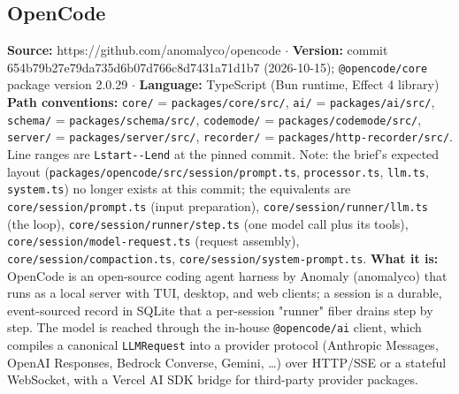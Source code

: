 \subsection{OpenCode}

\textbf{Source:} https://github.com/anomalyco/opencode $\cdot$ \textbf{Version:} commit 654b79b27e79da735d6b07d766c8d7431a71d1b7 (2026-10-15); \texttt{@opencode/\allowbreak{}core} package version 2.0.29 $\cdot$ \textbf{Language:} TypeScript (Bun runtime, Effect 4 library)
\textbf{Path conventions:} \texttt{core/\allowbreak{}} = \texttt{packages/\allowbreak{}core/\allowbreak{}src/\allowbreak{}}, \texttt{ai/\allowbreak{}} = \texttt{packages/\allowbreak{}ai/\allowbreak{}src/\allowbreak{}}, \texttt{schema/\allowbreak{}} = \texttt{packages/\allowbreak{}schema/\allowbreak{}src/\allowbreak{}}, \texttt{codemode/\allowbreak{}} = \texttt{packages/\allowbreak{}codemode/\allowbreak{}src/\allowbreak{}}, \texttt{server/\allowbreak{}} = \texttt{packages/\allowbreak{}server/\allowbreak{}src/\allowbreak{}}, \texttt{recorder/\allowbreak{}} = \texttt{packages/\allowbreak{}http-\allowbreak{}recorder/\allowbreak{}src/\allowbreak{}}. Line ranges are \texttt{Lstart-\allowbreak{}-\allowbreak{}Lend} at the pinned commit. Note: the brief's expected layout (\texttt{packages/\allowbreak{}opencode/\allowbreak{}src/\allowbreak{}session/\allowbreak{}prompt.\allowbreak{}ts}, \texttt{processor.\allowbreak{}ts}, \texttt{llm.\allowbreak{}ts}, \texttt{system.\allowbreak{}ts}) no longer exists at this commit; the equivalents are \texttt{core/\allowbreak{}session/\allowbreak{}prompt.\allowbreak{}ts} (input preparation), \texttt{core/\allowbreak{}session/\allowbreak{}runner/\allowbreak{}llm.\allowbreak{}ts} (the loop), \texttt{core/\allowbreak{}session/\allowbreak{}runner/\allowbreak{}step.\allowbreak{}ts} (one model call plus its tools), \texttt{core/\allowbreak{}session/\allowbreak{}model-\allowbreak{}request.\allowbreak{}ts} (request assembly), \texttt{core/\allowbreak{}session/\allowbreak{}compaction.\allowbreak{}ts}, \texttt{core/\allowbreak{}session/\allowbreak{}system-\allowbreak{}prompt.\allowbreak{}ts}.
\textbf{What it is:} OpenCode is an open-source coding agent harness by Anomaly (anomalyco) that runs as a local server with TUI, desktop, and web clients; a session is a durable, event-sourced record in SQLite that a per-session "runner" fiber drains step by step. The model is reached through the in-house \texttt{@opencode/\allowbreak{}ai} client, which compiles a canonical \texttt{LLMRequest} into a provider protocol (Anthropic Messages, OpenAI Responses, Bedrock Converse, Gemini, \ldots{}) over HTTP/SSE or a stateful WebSocket, with a Vercel AI SDK bridge for third-party provider packages.

